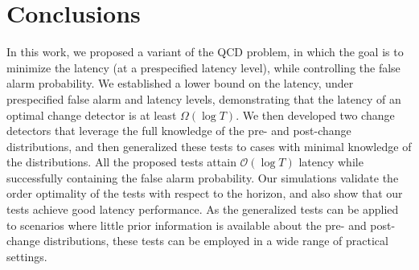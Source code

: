 \documentclass[12pt]{interact}
\newcommand{\lp}{\left(}
\newcommand{\rp}{\right)}
\newcommand{\mcal}{\mathcal}
\theoremstyle{plain}
\begin{document}
\section{Conclusions}
\label{sec:Sum}

In this work, we proposed a variant of the QCD problem, in which the goal is to minimize the latency (at a prespecified latency level), while controlling the false alarm probability. We established a lower bound on the latency, under prespecified false alarm and latency levels, demonstrating that the latency of an optimal change detector is at least $\Omega(\log T)$. We then developed two change detectors that leverage the full knowledge of the pre- and post-change distributions, and then generalized these tests to cases with minimal knowledge of the distributions. All the proposed tests attain $\mcal{O}\lp\log T\rp$ latency while successfully containing the false alarm probability. 
Our simulations validate the order optimality of the tests with respect to the horizon, and also show that our tests achieve good latency performance.
As the generalized tests can be applied to scenarios where little prior information is available about the pre- and post-change distributions, these tests can be employed in a wide range of practical settings. 
\end{document}
